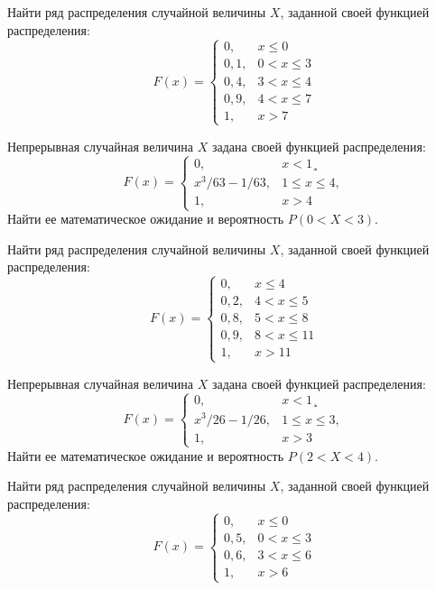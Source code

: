 \vfill

\newpage\setcounter{zad}{0}

\z Найти ряд распределения случайной величины $X$, заданной своей функцией распределения: $$ F(x) = \begin{cases}0, & x \leqslant 0 \\ 0{,}1, & 0 < x \leqslant 3 \\ 0{,}4, & 3 < x \leqslant 4 \\ 0{,}9, & 4 < x \leqslant 7 \\ 1, & x > 7 \end{cases} $$


\vfill

\z Непрерывная случайная величина $X$ задана своей функцией распределения: $$ F(x) = \begin{cases}0, & x < 1¸\\ x^3/63-1/63, & 1 \leqslant x \leqslant 4, \\ 1, & x > 4 \end{cases} $$ Найти ее математическое ожидание и вероятность $P(0 < X < 3)$.
 

\vfill

\newpage\setcounter{zad}{0}

\z Найти ряд распределения случайной величины $X$, заданной своей функцией распределения: $$ F(x) = \begin{cases}0, & x \leqslant 4 \\ 0{,}2, & 4 < x \leqslant 5 \\ 0{,}8, & 5 < x \leqslant 8 \\ 0{,}9, & 8 < x \leqslant 11 \\ 1, & x > 11 \end{cases} $$


\vfill

\z Непрерывная случайная величина $X$ задана своей функцией распределения: $$ F(x) = \begin{cases}0, & x < 1¸\\ x^3/26-1/26, & 1 \leqslant x \leqslant 3, \\ 1, & x > 3 \end{cases} $$ Найти ее математическое ожидание и вероятность $P(2 < X < 4)$.
 

\vfill

\newpage\setcounter{zad}{0}

\z Найти ряд распределения случайной величины $X$, заданной своей функцией распределения: $$ F(x) = \begin{cases}0, & x \leqslant 0 \\ 0{,}5, & 0 < x \leqslant 3 \\ 0{,}6, & 3 < x \leqslant 6 \\ 1, & x > 6 \end{cases} $$


